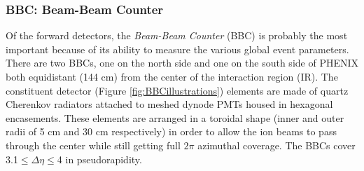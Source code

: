 \subsubsection{BBC: Beam-Beam Counter}
Of the forward detectors, the \textit{Beam-Beam Counter} (BBC) \citep{BBCfocus} is probably the most important because of its ability to measure the various global event parameters. There are two BBCs, one on the north side and one on the south side of PHENIX both equidistant (144 cm) from the center of the interaction region (IR). The constituent detector (Figure \ref{fig:BBCillustrations}) elements are made of quartz Cherenkov radiators attached to meshed dynode PMTs housed in hexagonal encasements. These elements are arranged in a toroidal shape (inner and outer radii of 5 cm and 30 cm respectively) in order to allow the ion beams to pass through the center while still getting full $2\pi$ azimuthal coverage. The BBCs cover 3.1$\leq \Delta \eta \leq$4 in pseudorapidity. 
